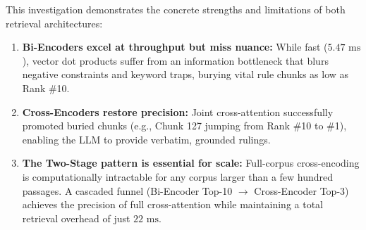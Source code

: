 \documentclass[11pt,a4paper]{article}
\begin{document}
This investigation demonstrates the concrete strengths and limitations of both retrieval architectures:
\begin{enumerate}[itemsep=1.5pt,topsep=1.5pt]
    \item \textbf{Bi-Encoders excel at throughput but miss nuance:} While fast ($5.47\text{ ms}$), vector dot products suffer from an information bottleneck that blurs negative constraints and keyword traps, burying vital rule chunks as low as Rank \#10.
    \item \textbf{Cross-Encoders restore precision:} Joint cross-attention successfully promoted buried chunks (e.g., Chunk 127 jumping from Rank \#10 to \#1), enabling the LLM to provide verbatim, grounded rulings.
    \item \textbf{The Two-Stage pattern is essential for scale:} Full-corpus cross-encoding is computationally intractable for any corpus larger than a few hundred passages. A cascaded funnel (Bi-Encoder Top-10 $\to$ Cross-Encoder Top-3) achieves the precision of full cross-attention while maintaining a total retrieval overhead of just $22\text{ ms}$.
\end{enumerate}
\end{document}
